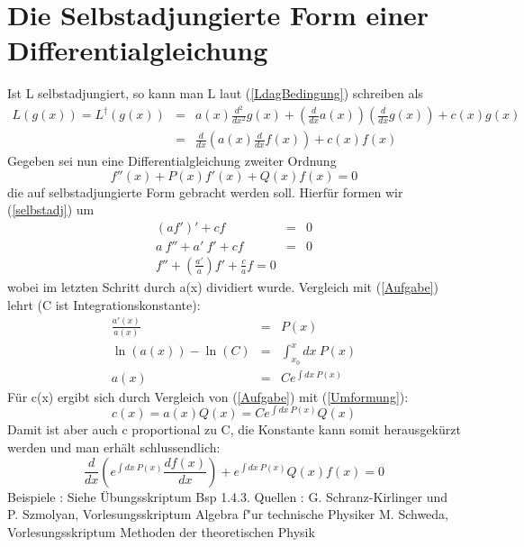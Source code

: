 \documentclass[a4paper,12pt]{article}
\begin{document}
\section*{Die Selbstadjungierte Form einer Differentialgleichung}
Ist L selbstadjungiert, so kann man L laut (\ref{LdagBedingung}) schreiben als
\begin{eqnarray}
L(g(x))=L^\dag(g(x))&=&a(x) \frac{d^2}{dx^2} g(x) + \left(\frac{d}{dx}a(x)\right)\left(\frac{d}{dx}g(x)\right)+c(x)g(x)\nonumber\\&=&
\frac{d}{dx}\left(a(x)\frac{d}{dx}f(x)\right) + c(x)f(x)\label{selbstadj}
\end{eqnarray}
Gegeben sei nun eine Differentialgleichung zweiter Ordnung
\begin{equation}
  f''(x)+P(x)f'(x)+Q(x)f(x) = 0 \label{Aufgabe}
\end{equation}
die auf selbstadjungierte Form gebracht werden soll. Hierf\"ur formen wir (\ref{selbstadj}) um
\begin{eqnarray}
  (a f')' +cf &=& 0\nonumber\\
  a \ f'' + a' \ f'+c f &=&0\nonumber\\
  f'' + \left(\frac{a'}{a}\right)f'+\frac{c}{a}f = 0\label{Umformung}
\end{eqnarray}
wobei im letzten Schritt durch a(x) dividiert wurde. Vergleich mit (\ref{Aufgabe}) lehrt (C ist Integrationskonstante):
\begin{eqnarray*}
  \frac{a'(x)}{a(x)}&=&P(x)\\
  \ln(a(x)) -\ln(C)&=&\int_{x_0}^x dx\ P(x)\\
  a(x) &=& C e^{\int dx \ P(x)}
\end{eqnarray*}
F\"ur c(x) ergibt sich durch Vergleich von (\ref{Aufgabe}) mit (\ref{Umformung}):
\begin{equation}
c(x) = a(x)   Q(x) =  C e^{\int dx \ P(x)} Q(x)
\end {equation}
Damit ist aber auch c proportional zu C, die Konstante kann somit herausgek\"urzt werden und man erh\"alt schlussendlich:
\begin{equation}
  \frac{d}{dx}\left(e^{\int dx \ P(x)}\frac{df(x)}{dx}\right)+e^{\int dx \ P(x)} Q(x) f(x)=0
\end{equation}
\newline
Beispiele : Siehe \"Ubungsskriptum Bsp 1.4.3.
\newline
Quellen : \newline
[1] G. Schranz-Kirlinger und P. Szmolyan, Vorlesungsskriptum Algebra f"ur technische Physiker \newline
[2] M. Schweda, Vorlesungsskriptum Methoden der theoretischen Physik
\end{document}
